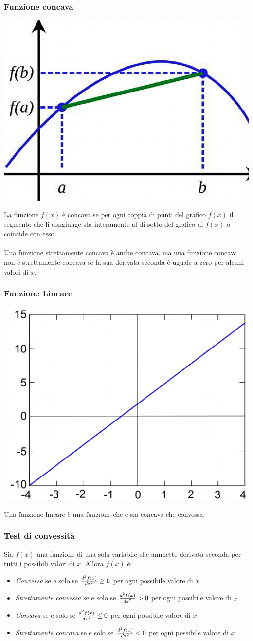 \documentclass[12pt,a4paper]{article}
\begin{document}
\subsubsection{Funzione concava}
\begin{center}
\includegraphics[width=0.3\columnwidth]{img/f_concava.png}
\end{center}
La funzione $f(x)$ è concava se per ogni coppia di punti del grafico $f(x)$ il segmento che li congiunge sta interamente al di sotto del grafico di $f(x)$ o coincide con esso.\\
\\
Una funzione strettamente concava è anche concava, ma una funzione concava non è strettamente concava se la sua derivata seconda è uguale a zero per alcuni valori di $x$.

\subsubsection{Funzione Lineare}
\begin{center}
\includegraphics[width=0.3\columnwidth]{img/f_lineare.png}
\end{center}
Una funzione lineare è una funzione che è sia concava che convessa.

\subsubsection{Test di convessità}
Sia $f(x)$ una funzione di una sola variabile che ammette derivata seconda per tutti i possibili valori di $x$. Allora $f(x)$ è:
\begin{itemize}
\item \textsl{Convessa} se e solo se ${d^2f(x) \over dx^2} \geq 0$ per ogni possibile valore di $x$\\
\item \textsl{Strettamente convessa} se e solo se ${d^2f(x) \over dx^2} > 0$ per ogni possibile valore di $x$\\
\item \textsl{Concava} se e solo se ${d^2f(x) \over dx^2} \leq 0$ per ogni possibile valore di $x$\\
\item \textsl{Strettamente concava} se e solo se ${d^2f(x) \over dx^2} < 0$ per ogni possibile valore di $x$\\
\end{itemize}
\end{document}

